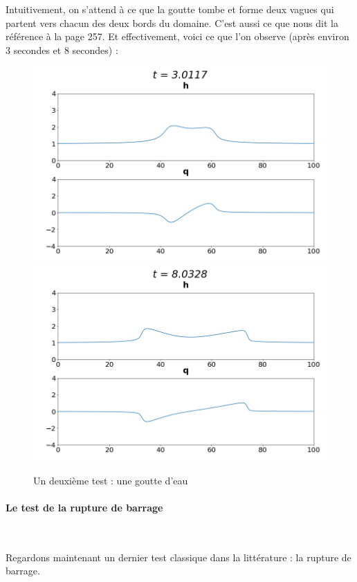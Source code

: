 \documentclass[
11pt, %
francais, %
singlespacing, %
headsepline, %
]{MastersDoctoralThesis} %
\theoremstyle{definition}
\begin{document}
Intuitivement, on s'attend à ce que la \og goutte \fg{} tombe et forme deux vagues qui partent vers chacun des deux bords du domaine.
C'est aussi ce que nous dit la référence \cite{RL} à la page 257. Et effectivement, voici ce que l'on observe (après environ 3 secondes et 8 secondes) :

\begin{figure}
\includegraphics[scale = .6]{bosse4.png}
\includegraphics[scale = .6]{bosse10.png} 
\caption{Un deuxième test : une goutte d'eau}
\end{figure}

\paragraph{Le test de la rupture de barrage} \

Regardons maintenant un dernier test classique dans la littérature : la rupture de barrage.
\end{document}
